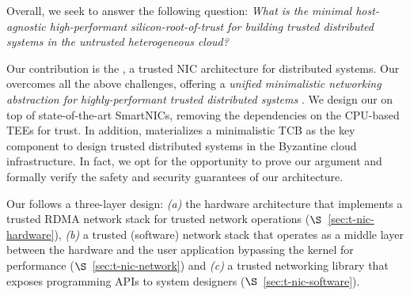 

Overall, we seek to answer the following question: {\em What is the minimal host-agnostic high-performant silicon-root-of-trust for building trusted distributed systems in the untrusted heterogeneous cloud?}


Our contribution is the \projecttitle{}, a trusted NIC architecture for distributed systems. Our \projecttitle{} overcomes all the above challenges, offering a {\em unified minimalistic networking abstraction for highly-performant trusted distributed systems} . 
We design our \projecttitle{} on top of state-of-the-art SmartNICs, removing the dependencies on the CPU-based TEEs for trust. In addition, \projecttitle{} materializes a minimalistic TCB as the key component to design trusted distributed systems in the Byzantine cloud infrastructure. In fact, we opt for the opportunity to prove our argument and formally verify the safety and security guarantees of our \projecttitle{} architecture. %



Our \projecttitle{} follows a three-layer design: {\em (a)} the \projecttitle{} hardware architecture that implements a trusted RDMA network stack for trusted network operations ($\S$~\ref{sec:t-nic-hardware}), {\em (b)} a trusted (software) network stack that operates as a middle layer between the hardware and the user application bypassing the kernel for performance ($\S$~\ref{sec:t-nic-network}) and {\em (c)} a trusted networking library that exposes programming APIs to system designers ($\S$~\ref{sec:t-nic-software}). 

